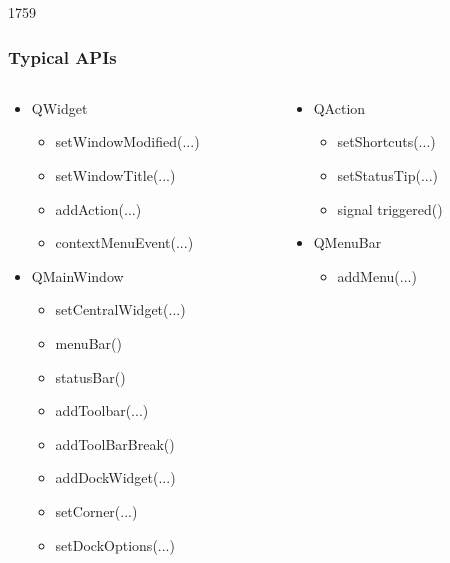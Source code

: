 \begin{slide}{1759}
  \frametitle{Typical APIs}
  \begin{columns}[t]
    \begin{column}{5cm}
      \begin{itemize}
      \item QWidget
        \begin{itemize}
        \item setWindowModified(...)
        \item setWindowTitle(...)
        \item addAction(...)
        \item contextMenuEvent(...)
       \end{itemize}

      \item QMainWindow
        \begin{itemize}
        \item setCentralWidget(...)
        \item menuBar()
        \item statusBar()
        \item addToolbar(...)
        \item addToolBarBreak()
        \item addDockWidget(...)
        \item setCorner(...)
        \item setDockOptions(...)
       \end{itemize}

     \end{itemize}
    \end{column}
    
    \begin{column}[T]{5cm}
     \begin{itemize}
      \item QAction
        \begin{itemize}
        \item setShortcuts(...)
        \item setStatusTip(...)
        \item signal triggered()
        \end{itemize}
        
      \item QMenuBar
        \begin{itemize}
        \item addMenu(...)
        \end{itemize}
        

\end{itemize}
\end{column}
\end{columns}
\end{slide}
